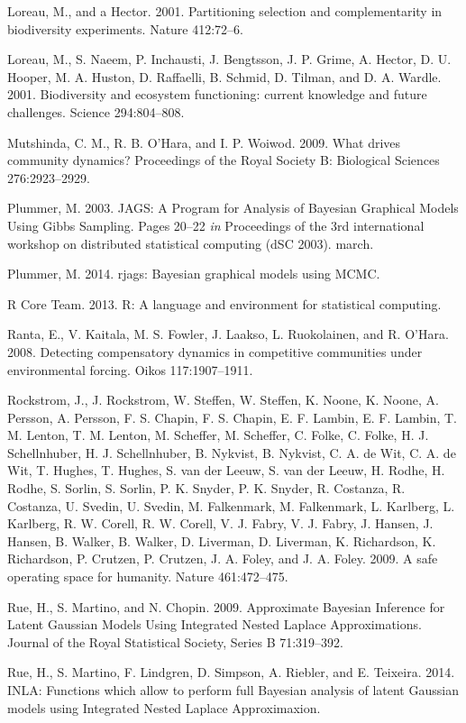 \documentclass[11pt,]{article}
\begin{document}
Loreau, M., and a Hector. 2001. Partitioning selection and
complementarity in biodiversity experiments. Nature 412:72--6.

Loreau, M., S. Naeem, P. Inchausti, J. Bengtsson, J. P. Grime, A.
Hector, D. U. Hooper, M. A. Huston, D. Raffaelli, B. Schmid, D. Tilman,
and D. A. Wardle. 2001. Biodiversity and ecosystem functioning: current
knowledge and future challenges. Science 294:804--808.

Mutshinda, C. M., R. B. O'Hara, and I. P. Woiwod. 2009. What drives
community dynamics? Proceedings of the Royal Society B: Biological
Sciences 276:2923--2929.

Plummer, M. 2003. JAGS: A Program for Analysis of Bayesian Graphical
Models Using Gibbs Sampling. Pages 20--22 \emph{in} Proceedings of the
3rd international workshop on distributed statistical computing (dSC
2003). march.

Plummer, M. 2014. rjags: Bayesian graphical models using MCMC.

R Core Team. 2013. R: A language and environment for statistical
computing.

Ranta, E., V. Kaitala, M. S. Fowler, J. Laakso, L. Ruokolainen, and R.
O'Hara. 2008. Detecting compensatory dynamics in competitive communities
under environmental forcing. Oikos 117:1907--1911.

Rockstrom, J., J. Rockstrom, W. Steffen, W. Steffen, K. Noone, K. Noone,
A. Persson, A. Persson, F. S. Chapin, F. S. Chapin, E. F. Lambin, E. F.
Lambin, T. M. Lenton, T. M. Lenton, M. Scheffer, M. Scheffer, C. Folke,
C. Folke, H. J. Schellnhuber, H. J. Schellnhuber, B. Nykvist, B.
Nykvist, C. A. de Wit, C. A. de Wit, T. Hughes, T. Hughes, S. van der
Leeuw, S. van der Leeuw, H. Rodhe, H. Rodhe, S. Sorlin, S. Sorlin, P. K.
Snyder, P. K. Snyder, R. Costanza, R. Costanza, U. Svedin, U. Svedin, M.
Falkenmark, M. Falkenmark, L. Karlberg, L. Karlberg, R. W. Corell, R. W.
Corell, V. J. Fabry, V. J. Fabry, J. Hansen, J. Hansen, B. Walker, B.
Walker, D. Liverman, D. Liverman, K. Richardson, K. Richardson, P.
Crutzen, P. Crutzen, J. A. Foley, and J. A. Foley. 2009. A safe
operating space for humanity. Nature 461:472--475.

Rue, H., S. Martino, and N. Chopin. 2009. Approximate Bayesian Inference
for Latent Gaussian Models Using Integrated Nested Laplace
Approximations. Journal of the Royal Statistical Society, Series B
71:319--392.

Rue, H., S. Martino, F. Lindgren, D. Simpson, A. Riebler, and E.
Teixeira. 2014. INLA: Functions which allow to perform full Bayesian
analysis of latent Gaussian models using Integrated Nested Laplace
Approximaxion.
\end{document}
